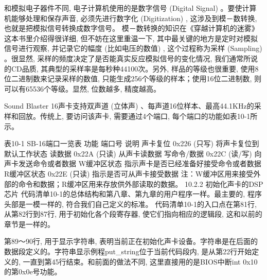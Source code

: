\documentclass[12pt]{article}
\begin{document}
\begin{CJK}{UTF8}{gbsn}
和模拟电子器件不同, 电子计算机使用的是数字信号 (Digital Signal) 。要使计算机能够处理和保存声音, 必须先进行数字化 (Digitization) , 这涉及到模－数转换, 也就是把模拟信号转换成数字信号。
模－数转换的知识在《穿越计算机的迷雾》这本书里介绍得很详细, 但不妨在这里重温一下, 其中最关键的地方是定时对模拟信号进行观察, 并记录它的幅度 (比如电压的数值) , 这个过程称为采样 (Sampling) 。很显然, 采样的频度决定了是否能真实反应模拟信号的变化情况, 我们通常所说的CD品质, 其典型的采样率是每秒种44100次。另外, 样品的等级也很重要, 使用8位二进制数来记录采样的数值, 只能生成256个等级的样本；使用16位二进制数, 则可以有65536个等级。显然, 位数越多, 精度越高。

Sound Blaster 16声卡支持双声道 (立体声) 、每声道16位样本、最高44.1KHz的采样和回放。传统上, 要访问该声卡, 需要通过4个端口, 每个端口的功能如表10-1所示。

表10-1 SB-16端口一览表
功能	端口号	说明
声卡复位	0x226 (只写) 	将声卡复位到默认工作状态
读数据	0x22A (只读) 	从声卡读数据
写命令/数据	0x22C (读/写) 	向声卡发送命令或者数据
W缓冲区状态		指示声卡是否已经准备好接受命令或者数据
R缓冲区状态	0x22E (只读) 	指示是否可从声卡接受数据
注：W缓冲区用来接受外部的命令和数据；R缓冲区用来存放供外部读取的数据。
10.2.2  初始化声卡的DSP芯片
代码清单10-1的总体结构和第八章、第九章的用户程序一样。最主要的, 程序头部是一模一样的, 符合我们自己定义的标准。
代码清单10-1的入口点在第81行, 从第82行到87行, 用于初始化各个段寄存器, 使它们指向相应的逻辑段, 这和以前的章节是一样的。

第89～90行, 用于显示字符串, 表明当前正在初始化声卡设备。字符串是在后面的数据段定义的。字符串显示例程put\_{}string位于当前代码段内, 是从第22行开始定义的, 一直到第45行结束。和前面的做法不同, 这里直接用的是BIOS中断int 0x10的第0x0e号功能。


\end{CJK}
\end{document}

